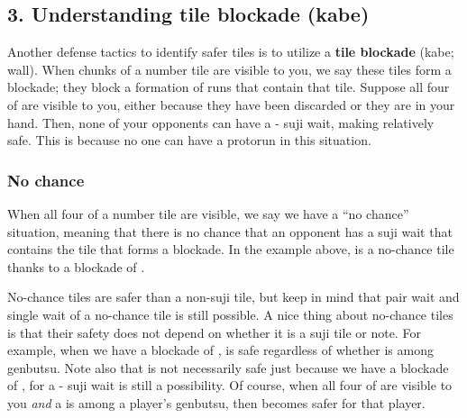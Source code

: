 {{\subsection*{3. Understanding tile blockade ({\jap kabe})} \label{sec:blockade}
Another defense tactics to identify safer tiles is to utilize a {\bf tile blockade} ({\jap kabe}; wall). When chunks of a number tile are visible to you, we say these tiles form a blockade; they block a formation of runs that contain that tile. Suppose all four of {\large{}} are visible to you, either because they have been discarded or they are in your hand.
Then, none of your opponents can have a {\large{}-} {\jap suji} wait, making {\large{}} relatively safe. This is because no one can have a protorun {\large{}} in this situation. 

\subsubsection{No chance}
When all four of a number tile are visible, we say we have a ``no chance'' situation, meaning that there is no chance that an opponent has a {\jap suji} wait that contains the tile that forms a blockade. In the example above, {\large{}} is a no-chance tile thanks to a blockade of {\large{}}. 

\bigskip
No-chance tiles are safer than a non-{\jap suji} tile, but keep in mind that pair wait and single wait of a no-chance tile is still possible. 
A nice thing about no-chance tiles is that their safety does not depend on whether it is a {\jap suji} tile or note. For example, when we have a blockade of {\large{}}, {\large{}} is safe regardless of whether {\large{}} is among {\jap genbutsu}. Note also that {\large{}} is not necessarily safe just because we have a blockade of {\large{}}, for a {\large{}-} {\jap suji} wait is still a possibility. 
Of course, when all four of {\large{}} are visible to you \emph{and} a {\large{}} is among a player's {\jap genbutsu}, then {\large{}} becomes safer for that player. 

}}
